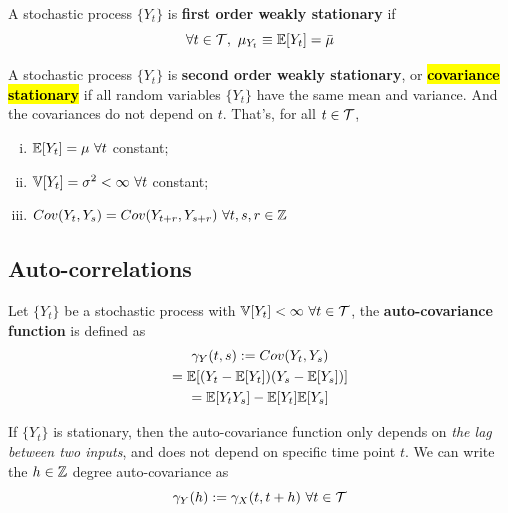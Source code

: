 \documentclass[11pt]{article}
\begin{document}
		\begin{definition}
			A stochastic process $\{Y_t\}$ is \textbf{first order weakly stationary} if
			\begin{equation}
				\forall t \in \mathcal{{T}},\ \mu_{Y_t} \equiv \mathbb{E}[{Y_t}] = \bar{\mu}
			\end{equation}
		\end{definition}
		
		\begin{definition}
			A stochastic process $\{Y_t\}$ is \textbf{second order weakly stationary}, or \hl{\textbf{covariance stationary}} if all random variables $\{Y_t\}$ have the same mean and variance. And the covariances do not depend on $t$.
			That's, for all $t \in \mathcal{{T}}$,
			\begin{enumerate}[(i)]
				\item $\mathbb{E}[{Y_t}] = \mu\ \forall t$ constant;
				\item $\var{Y_t} = \sigma^2 < \infty\ \forall t$ constant;
				\item $Cov(Y_t, Y_s) = Cov(Y_{t+r}, Y_{s+r})\ \forall t,s,r\in \Z$
			\end{enumerate}
		\end{definition}
		
		\subsection{Auto-correlations}
		
		\begin{definition}
			Let $\{Y_t\}$ be a stochastic process with $\mathbb{V}[{Y_t}] < \infty\ \forall t \in \mathcal{{T}}$, the \textbf{auto-covariance function} is defined as
			\begin{gather}
				\gamma_Y(t, s) := Cov(Y_t, Y_s) \\
				= \mathbb{E}[{(Y_t - \mathbb{E}[{Y_t}])(Y_s - \mathbb{E}[{Y_s}])}] \\
				= \mathbb{E}[{Y_t Y_s}] - \mathbb{E}[{Y_t}] \mathbb{E}[{Y_s}]
			\end{gather}
		\end{definition}
		
		\begin{lemma}
			If $\{Y_t\}$ is stationary, then the auto-covariance function only depends on \emph{the lag between two inputs}, and does not depend on specific time point $t$. We can write the $h \in \mathbb{Z}$ degree auto-covariance as 
			\begin{equation}
				\gamma_Y(h) := \gamma_X(t, t+h)\ \forall t \in \mathcal{{T}}
			\end{equation}
		\end{lemma}
	
\end{document}
